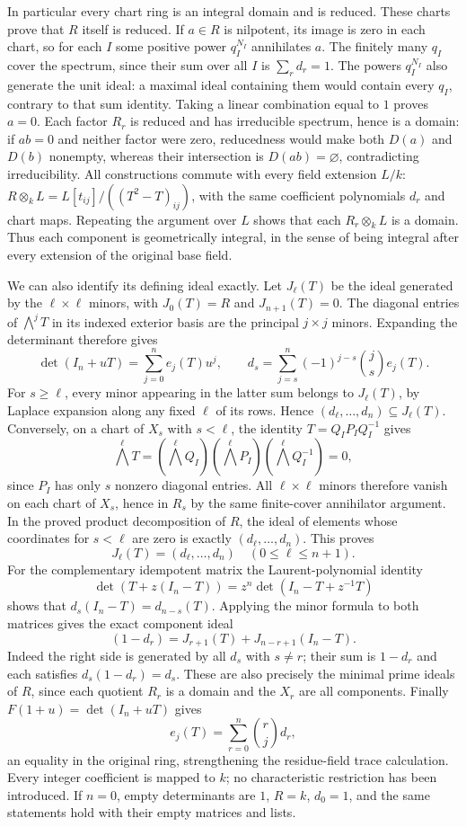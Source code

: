 \begin{example}
In particular every chart ring is an integral domain and is reduced.
These charts prove that $R$ itself is reduced. If $a\in R$ is
nilpotent, its image is zero in each chart, so for each $I$ some
positive power $q_I^{N_I}$ annihilates $a$. The finitely many
$q_I$ cover the spectrum, since their sum over all $I$ is
$\sum_r d_r=1$. The powers $q_I^{N_I}$ also generate the unit
ideal: a maximal ideal containing them would contain every $q_I$,
contrary to that sum identity. Taking a linear combination equal
to $1$ proves $a=0$.
Each factor $R_r$ is reduced and has irreducible spectrum, hence is
a domain: if $ab=0$ and neither factor were zero, reducedness would
make both $D(a)$ and $D(b)$ nonempty, whereas their intersection is
$D(ab)=\varnothing$, contradicting irreducibility.
All constructions commute with every field extension $L/k$:
$R\otimes_k L=L[t_{ij}]/((T^2-T)_{ij})$, with the same coefficient
polynomials $d_r$ and chart maps. Repeating the argument over $L$
shows that each $R_r\otimes_k L$ is a domain. Thus each component
is geometrically integral, in the sense of being integral after
every extension of the original base field.

We can also identify its defining ideal exactly. Let $J_\ell(T)$
be the ideal generated by the $\ell\times\ell$ minors, with
$J_0(T)=R$ and $J_{n+1}(T)=0$. The diagonal entries of
$\bigwedge^jT$ in its indexed exterior basis are the principal
$j\times j$ minors. Expanding the determinant therefore gives
$$
\det(I_n+uT)=\sum_{j=0}^n e_j(T)u^j,
\qquad
d_s=\sum_{j=s}^n(-1)^{j-s}\binom js e_j(T).
$$
For $s\geq\ell$, every minor appearing in the latter sum belongs
to $J_\ell(T)$, by Laplace expansion along any fixed $\ell$ of
its rows. Hence $(d_\ell,\ldots,d_n)\subseteq J_\ell(T)$.
Conversely, on a chart of $X_s$ with $s<\ell$, the identity
$T=Q_IP_IQ_I^{-1}$ gives
$$
\bigwedge^\ell T
=(\bigwedge^\ell Q_I)(\bigwedge^\ell P_I)
 (\bigwedge^\ell Q_I^{-1})=0,
$$
since $P_I$ has only $s$ nonzero diagonal entries.
All $\ell\times\ell$ minors therefore vanish on each chart of
$X_s$, hence in $R_s$ by the same finite-cover annihilator argument.
In the proved product decomposition of $R$, the ideal of elements
whose coordinates for $s<\ell$ are zero is exactly
$(d_\ell,\ldots,d_n)$. This proves
$$
J_\ell(T)=(d_\ell,\ldots,d_n)
\quad(0\leq\ell\leq n+1).
$$
For the complementary idempotent matrix the Laurent-polynomial
identity
$$
\det(T+z(I_n-T))
=z^n\det(I_n-T+z^{-1}T)
$$
shows that $d_s(I_n-T)=d_{n-s}(T)$. Applying the minor formula
to both matrices gives the exact component ideal
$$
(1-d_r)=J_{r+1}(T)+J_{n-r+1}(I_n-T).
$$
Indeed the right side is generated by all $d_s$ with $s\ne r$;
their sum is $1-d_r$ and each satisfies $d_s(1-d_r)=d_s$.
These are also precisely the minimal prime ideals of $R$, since
each quotient $R_r$ is a domain and the $X_r$ are all components.
Finally $F(1+u)=\det(I_n+uT)$ gives
$$
e_j(T)=\sum_{r=0}^n\binom rj d_r,
$$
an equality in the original ring, strengthening the residue-field
trace calculation. Every integer coefficient is mapped to $k$;
no characteristic restriction has been introduced. If $n=0$,
empty determinants are $1$, $R=k$, $d_0=1$, and the same statements
hold with their empty matrices and lists.
\end{example}